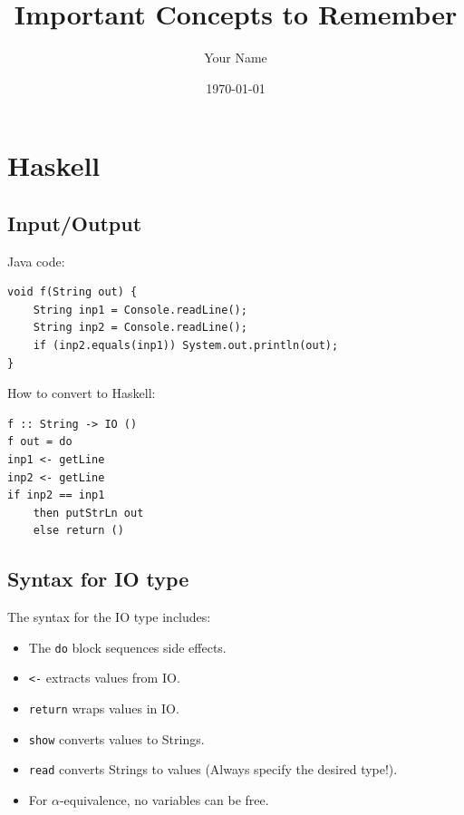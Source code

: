\documentclass{article}
\begin{document}
\title{Important Concepts to Remember}
\author{Your Name}
\date{\today}

\maketitle

\section{Haskell}

\subsection{Input/Output}

Java code:

\begin{lstlisting}[style=javastyle, caption=Java Code, label=code:java]
void f(String out) {
    String inp1 = Console.readLine();
    String inp2 = Console.readLine();
    if (inp2.equals(inp1)) System.out.println(out);
}
\end{lstlisting}

How to convert to Haskell:

\begin{lstlisting}[style=haskellstyle, caption=Haskell Code, label=code:haskell]
f :: String -> IO ()
f out = do
inp1 <- getLine
inp2 <- getLine
if inp2 == inp1
    then putStrLn out
    else return ()
\end{lstlisting}

\subsection{Syntax for IO type}

The syntax for the IO type includes:
\begin{itemize}
    \item The \texttt{do} block sequences side effects.
    \item \texttt{<-} extracts values from IO.
    \item \texttt{return} wraps values in IO.
    \item \texttt{show} converts values to Strings.
    \item \texttt{read} converts Strings to values (Always specify the desired type!).
    \item For $\alpha$-equivalence, no variables can be free.
\end{itemize}
\end{document}
